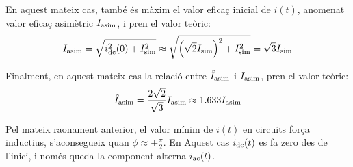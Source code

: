 En aquest mateix cas, també és màxim el valor eficaç inicial de $i(t)$, anomenat valor eficaç asimètric $I_\mathrm{asim}$,  i pren el valor teòric:
\begin{equation}
    I_\mathrm{asim} = \sqrt{i_\mathrm{dc}^2(0) + I_\mathrm{sim}^2} \approx \sqrt{\left(\sqrt{2}I_\mathrm{sim}\right)^2 + I_\mathrm{sim}^2} = \sqrt{3} I_\mathrm{sim} \label{eq:I_asim_eff}
\end{equation}

Finalment, en aquest mateix cas la relació entre $\hat{I}_\mathrm{asim}$ i $I_\mathrm{asim}$,   pren el valor teòric:
\begin{equation}
    \hat{I}_\mathrm{asim} = \frac{2\sqrt{2}}{\sqrt{3}} I_\mathrm{asim} \approx
    \num{1,633} I_\mathrm{asim}
\end{equation}

Pel mateix raonament anterior, el valor mínim de $i(t)$ en circuits força inductius, s'aconsegueix quan $\phi \approx \pm\frac{\pi}{2}$. En Aquest cas $i_\mathrm{dc}(t)$ es fa zero des de l'inici, i només queda la component alterna $i_\mathrm{ac}(t)$.

